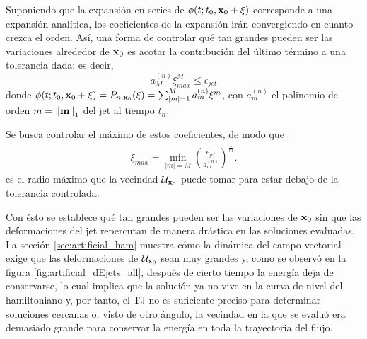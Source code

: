 
Suponiendo que la expansión en series de $\phi(t;t_0,\mathbf{x}_0 + \xi)$ corresponde a una expansión analítica, los coeficientes de la expansión irán convergiendo en cuanto crezca el orden. Así, una forma de controlar qué tan grandes pueden ser las variaciones alrededor de $\mathbf{x}_0$ es acotar la contribución del último término a una tolerancia dada; es decir,
\begin{equation*}
 a_{M}^{(n)}\xi_{max}^M \leq \epsilon_{jet}
\end{equation*}
donde $\phi(t;t_0,\mathbf{x}_0 + \xi) = P_{n,\mathbf{x}_0}(\xi) = \sum_{|m|=1}^M  a_{m}^{(n)} \xi^m$, con $a_{m}^{(n)}$ el polinomio de orden $m = \left\lVert\mathbf{m}\right\rVert_1$ del jet al tiempo $t_n$.

Se busca controlar el máximo de estos coeficientes, de modo que 
\begin{align}
 \xi_{max} = \min_{|m|=M} \left( \frac{\epsilon_{jet}}{a_{m}^{(n)}} \right)^{\frac{1}{m}}.
 \label{eq:ximax}
\end{align}
es el radio máximo que la vecindad $\mathcal{U}_{\mathbf{x}_0}$ puede tomar para estar debajo de la tolerancia controlada. 

Con ésto se establece qué tan grandes pueden ser las variaciones de $\mathbf{x}_0$ sin que las deformaciones del jet repercutan de manera drástica en las soluciones evaluadas. La sección \ref{sec:artificial_ham} muestra cómo la dinámica del campo vectorial exige que las deformaciones de $\mathcal{U}_{\mathbf{x}_0}$ sean muy grandes y, como se observó en la figura \ref{fig:artificial_dEjets_all}, después de cierto tiempo la energía deja de conservarse, lo cual implica que la solución ya no vive en la curva de nivel del hamiltoniano y, por tanto, el TJ no es suficiente preciso para determinar soluciones cercanas o, visto de otro ángulo, la vecindad en la que se evaluó era demasiado grande para conservar la energía en toda la trayectoria del flujo.

